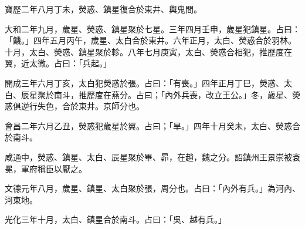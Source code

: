 \begin{pinyinscope}
 寶歷二年八月丁未，熒惑、鎮星復合於東井、輿鬼間。



 大和二年九月，歲星、熒惑、鎮星聚於七星。三年四月壬申，歲星犯鎮星。占曰：「饑。」四年五月丙午，歲星、太白合於東井。六年正月，太白、熒惑合於羽林。十月，太白、熒惑、鎮星聚於軫。八年七月庚寅，太白、熒惑合相犯，推歷度在翼，近太微。占曰：「兵起。」



 開成三年六月丁亥，太白犯熒惑於張。占曰：「有喪。」四年正月丁巳，熒惑、太白、辰星聚於南斗，推歷度在燕分。占曰；「內外兵喪，改立王公。」冬，歲星、熒惑俱逆行失色，合於東井。京師分也。



 會昌二年六月乙丑，熒惑犯歲星於翼。占曰；「旱。」四年十月癸未，太白、熒惑合於南斗。



 咸通中，熒惑、鎮星、太白、辰星聚於畢、昴，在趙，魏之分。詔鎮州王景崇被袞冕，軍府稱臣以厭之。



 文德元年八月，歲星、鎮星、太白聚於張，周分也。占曰：「內外有兵。」為河內、河東地。



 光化三年十月，太白、鎮星合於南斗。占曰：「吳、越有兵。」



\end{pinyinscope}